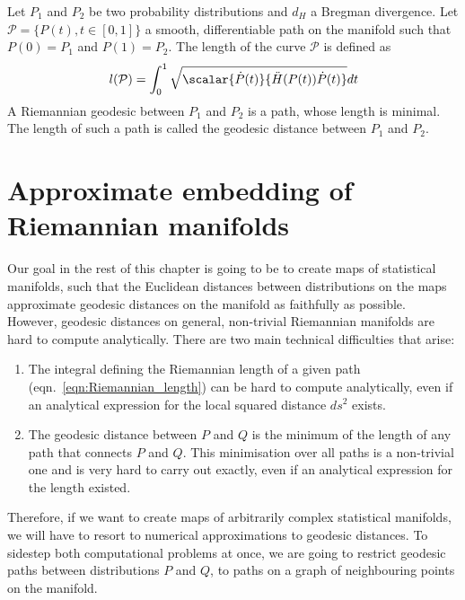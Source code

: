 \begin{definition}
	Let $P_1$ and $P_2$ be two probability distributions and $d_H$ a Bregman divergence. Let $\mathcal{P}=\{P(t),t\in[0,1]\}$ a smooth, differentiable path on the manifold such that $P(0)=P_1$ and $P(1)=P_2$. The length of the curve $\mathcal{P}$ is defined as
	\begin{equation}
		l(\mathcal{P}) = \int_{0}^{1} \sqrt{ \scalar{\dot{P}(t)}{\ddot{H}(P(t))\dot{P}(t)}} dt \label{eqn:Riemannian_length}
	\end{equation}
	A Riemannian geodesic between $P_1$ and $P_2$ is a path, whose length is minimal. The length of such a path is called the geodesic distance between $P_1$ and $P_2$.
\end{definition}


\section{Approximate embedding of Riemannian manifolds}

Our goal in the rest of this chapter is going to be to create maps of statistical manifolds, such that the Euclidean distances between distributions on the maps approximate geodesic distances on the manifold as faithfully as possible. However, geodesic distances on general, non-trivial Riemannian manifolds are hard to compute analytically. There are two main technical difficulties that arise:

\begin{enumerate}
	\item The integral defining the Riemannian length of a given path (eqn.\ \eqref{eqn:Riemannian_length}) can be hard to compute analytically, even if an analytical expression for the local squared distance $ds^2$ exists.
	\item The geodesic distance between $P$ and $Q$ is the minimum of the length of any path that connects $P$ and $Q$. This minimisation over all paths is a non-trivial one and is very hard to carry out exactly, even if an analytical expression for the length existed.
\end{enumerate}

Therefore, if we want to create maps of arbitrarily complex statistical manifolds, we will have to resort to numerical approximations to geodesic distances. To sidestep both computational problems at once, we are going to restrict geodesic paths between distributions $P$ and $Q$, to paths on a graph of neighbouring points on the manifold.

